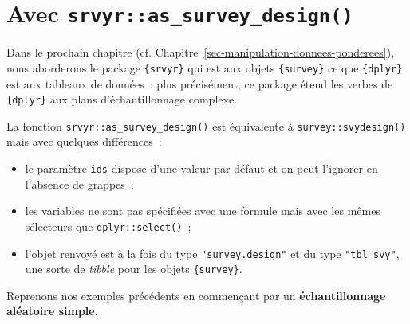 \documentclass[
  letterpaper,
  DIV=11,
  numbers=noendperiod,
  oneside]{scrreprt}
\newenvironment{Shaded}{\begin{snugshade}}{\end{snugshade}}
\newcommand{\AttributeTok}[1]{\textcolor[rgb]{0.40,0.45,0.13}{#1}}
\newcommand{\DecValTok}[1]{\textcolor[rgb]{0.68,0.00,0.00}{#1}}
\newcommand{\FunctionTok}[1]{\textcolor[rgb]{0.28,0.35,0.67}{#1}}
\newcommand{\NormalTok}[1]{\textcolor[rgb]{0.00,0.23,0.31}{#1}}
\newcommand{\OtherTok}[1]{\textcolor[rgb]{0.00,0.23,0.31}{#1}}
\newcommand{\SpecialCharTok}[1]{\textcolor[rgb]{0.37,0.37,0.37}{#1}}
\providecommand{\tightlist}{%
  \setlength{\itemsep}{0pt}\setlength{\parskip}{0pt}}\usepackage{longtable,booktabs,array}
\begin{document}
\begin{Shaded}
\end{Shaded}

\hypertarget{avec-srvyras_survey_design}{%
\section{\texorpdfstring{Avec
\texttt{srvyr::as\_survey\_design()}}{Avec srvyr::as\_survey\_design()}}\label{avec-srvyras_survey_design}}

Dans le prochain chapitre (cf.
Chapitre~\ref{sec-manipulation-donnees-ponderees}), nous aborderons le
package \texttt{\{srvyr\}} qui est aux objets \texttt{\{survey\}} ce que
\texttt{\{dplyr\}} est aux tableaux de données~: plus précisément, ce
package étend les verbes de \texttt{\{dplyr\}} aux plans
d'échantillonnage complexe.

La fonction \texttt{srvyr::as\_survey\_design()} est équivalente à
\texttt{survey::svydesign()} mais avec quelques différences~:

\begin{itemize}
\tightlist
\item
  le paramètre \texttt{ids} dispose d'une valeur par défaut et on peut
  l'ignorer en l'absence de grappes~;
\item
  les variables ne sont pas spécifiées avec une formule mais avec les
  mêmes sélecteurs que \texttt{dplyr::select()}~;
\item
  l'objet renvoyé est à la fois du type \texttt{"survey.design"} et du
  type \texttt{"tbl\_svy"}, une sorte de \emph{tibble} pour les objets
  \texttt{\{survey\}}.
\end{itemize}

Reprenons nos exemples précédents en commençant par un
\textbf{échantillonnage aléatoire simple}.
\end{document}
